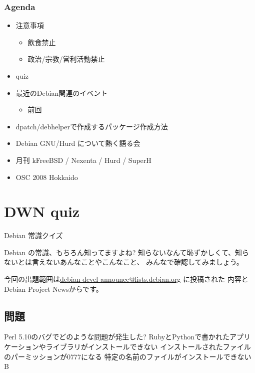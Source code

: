 \documentclass[cjk,dvipdfmx,12pt]{beamer}
\begin{document}
\begin{frame}
 \frametitle{Agenda}
\begin{minipage}[t]{0.45\hsize}
  \begin{itemize}
  \item 注意事項
	\begin{itemize}
	 \item 飲食禁止
	 \item 政治/宗教/営利活動禁止
	\end{itemize}
  \item quiz
  \item 最近のDebian関連のイベント
	\begin{itemize}
	 \item 前回 
	\end{itemize}
 \end{itemize}
\end{minipage} 
\begin{minipage}[t]{0.45\hsize}
 \begin{itemize}
  \item dpatch/debhelperで作成するパッケージ作成方法
  \item Debian GNU/Hurd について熱く語る会
  \item 月刊 kFreeBSD / Nexenta / Hurd / SuperH
  \item OSC 2008 Hokkaido
 \end{itemize}
\end{minipage}
\end{frame}



\section{DWN quiz}
\begin{frame}{Debian 常識クイズ}

Debian の常識、もちろん知ってますよね?
知らないなんて恥ずかしくて、知らないとは言えないあんなことやこんなこと、
みんなで確認してみましょう。

今回の出題範囲は\url{debian-devel-announce@lists.debian.org} に投稿された
内容とDebian Project Newsからです。

\end{frame}

\subsection{問題}

 \santaku
 {Perl 5.10のバグでどのような問題が発生した?}
 {RubyとPythonで書かれたアプリケーションやライブラリがインストールできない}
 {インストールされたファイルのパーミッションが0777になる}
 {特定の名前のファイルがインストールできない}
 {B}%
 
\end{document}
